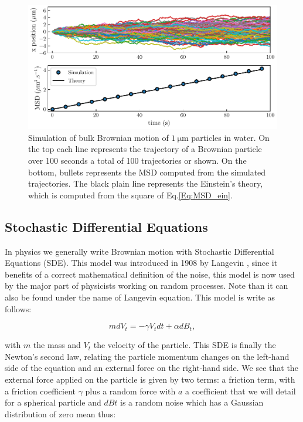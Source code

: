 \begin{figure}[!h]
	\centering
	\includegraphics{02_body/chapter1/image/brown_exemple.pdf}
	\caption{Simulation of bulk Brownian motion of $1 ~ \mathrm{\mu m}$ particles in water. On the top each line represents the trajectory of a Brownian particle over 100 seconds a total of 100 trajectories or shown. On the bottom, bullets represents the \gls{MSD} computed from the simulated trajectories. The black plain line represents the Einstein's theory, which is computed from the square of Eq.\ref{Eq:MSD_ein}.}
	\label{fig:bulkbrown}
\end{figure}

\subsection{Stochastic Differential Equations}

In physics we generally write Brownian motion with Stochastic Differential Equations (\gls{SDE}). This model was introduced in 1908 by Langevin \cite{langevin_sur_1908}, since it benefits of a correct mathematical definition of the noise, this model is now used by the major part of physicists working on random processes. Note than it can also be found under the name of Langevin equation. This model is write as follows:

\begin{equation}
	mdV_t  = - \gamma V_t dt + \alpha dB_t ,
\end{equation}


with $m$ the mass and $V_t$ the velocity of the particle. This \gls{SDE} is finally the Newton's second law, relating the particle momentum changes on the left-hand side of the equation and an external force on the right-hand side. We see that the external force applied on the particle is given by two terms: a friction term, with a friction coefficient $\gamma$ plus a random force with $a$ a coefficient that we will detail for a spherical particle and $dBt$ is a random noise which has a Gaussian distribution of zero mean thus:

